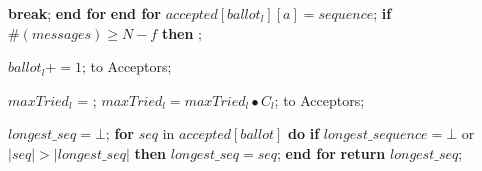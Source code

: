 \begin{algorithm}
\begin{algorithmic}[1]
		\State \hspace{\algorithmicindent}\hspace{\algorithmicindent}\hspace{\algorithmicindent}\hspace{\algorithmicindent}\hspace{\algorithmicindent}\hspace{\algorithmicindent} \textbf{break};
		\State \hspace{\algorithmicindent}\hspace{\algorithmicindent}\hspace{\algorithmicindent}\hspace{\algorithmicindent} \textbf{end for}
		\State \hspace{\algorithmicindent}\hspace{\algorithmicindent}\hspace{\algorithmicindent} \textbf{end for}
		\State \hspace{\algorithmicindent}\hspace{\algorithmicindent}\hspace{\algorithmicindent}  $accepted[ballot_l][a] = sequence$;
		\State
		\State \hspace{\algorithmicindent} \textbf{if} $\#(messages) \geq N-f$ \textbf{then} 
		\State \hspace{\algorithmicindent}\hspace{\algorithmicindent} ;

		\State
		\State $ballot_l \mathrel{+{=}} 1$;
		\State {} to Acceptors;
		\EndFunction
		
		\State
		\State $maxTried_l$ = ;
		\State $maxTried_l = maxTried_l \bullet C_l$;
		\State {} to Acceptors;
		\EndFunction
		
		\State
		\State $longest\_seq = \bot$;
		\State \textbf{for} $seq$ in $accepted[ballot]$ \textbf{do}
		\State \hspace{\algorithmicindent}\textbf{if} $longest\_sequence = \bot$ or $|seq| > |longest\_seq|$ \textbf{then}
		\State \hspace{\algorithmicindent}\hspace{\algorithmicindent}$longest\_seq =  seq$;
		\State \textbf{end for}
		\State \textbf{return} $longest\_seq$;
		\EndFunction
		

\end{algorithmic}
\end{algorithm}
